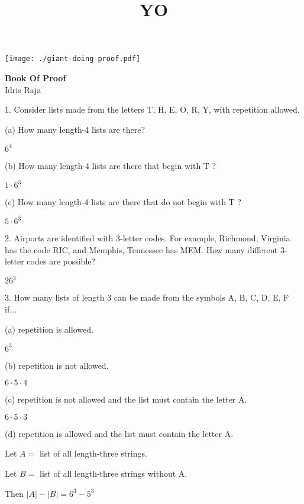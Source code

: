 \documentclass{idrisMemo}
\title{YO}
\begin{document}
\begin{titlepage}
    \texttt{[image: ./giant-doing-proof.pdf]} %
    \centering

    \vspace{2cm} %

    \begin{center}
        \Large \textbf{Book Of Proof} \\
        \normalsize Idris Raja
    \end{center}
\end{titlepage}
\pagebreak

\tableofcontents
\thispagestyle{styleTOC}
\pagebreak

\pagestyle{styleE}
\begin{prooflist} {1.  Consider lists made from the letters T, H, E, O, R, Y, with repetition allowed.}
    \item (a) How many length-4 lists are there?
    \item $ 6^4$
    \item (b) How many length-4 lists are there that begin with T ?
    \item $ 1 \cdot 6^3$
    \item (c) How many length-4 lists are there that do not begin with T ?
    \item $ 5 \cdot 6^3$
\end{prooflist}

\begin{prooflist} {2. Airports are identified with 3-letter codes. For example, Richmond, Virginia has the code RIC, and Memphis, Tennessee has MEM. How many different 3-letter codes are possible?}
    \item $ 26^3$
\end{prooflist}

\begin{prooflist} {3. How many lists of length 3 can be made from the symbols A, B, C, D, E, F if...}
    \item (a) repetition is allowed.
    \item $ 6^3$
    \item (b) repetition is not allowed.
    \item $ 6\cdot 5 \cdot 4$
    \item (c) repetition is not allowed and the list must contain the letter A.
    \item $ 6\cdot 5 \cdot 3$
    \item (d) repetition is allowed and the list must contain the letter A.
    \item Let $A=$ list of all length-three strings.
    \item Let $B=$ list of all length-three strings without A.
    \item Then $|A| - |B| = 6^3 - 5^3$
\end{prooflist}
\end{document}
